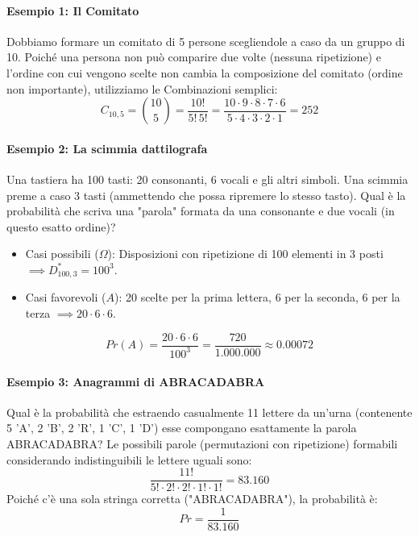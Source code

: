 \documentclass[12pt, a4paper]{article}
\begin{document}
\paragraph{Esempio 1: Il Comitato}
Dobbiamo formare un comitato di 5 persone scegliendole a caso da un gruppo di 10.
Poiché una persona non può comparire due volte (nessuna ripetizione) e l'ordine con cui vengono scelte non cambia la composizione del comitato (ordine non importante), utilizziamo le Combinazioni semplici:
$$ C_{10,5} = \binom{10}{5} = \frac{10!}{5! \, 5!} = \frac{10 \cdot 9 \cdot 8 \cdot 7 \cdot 6}{5 \cdot 4 \cdot 3 \cdot 2 \cdot 1} = 252 $$

\paragraph{Esempio 2: La scimmia dattilografa}
Una tastiera ha 100 tasti: 20 consonanti, 6 vocali e gli altri simboli. Una scimmia preme a caso 3 tasti (ammettendo che possa ripremere lo stesso tasto). Qual è la probabilità che scriva una "parola" formata da una consonante e due vocali (in questo esatto ordine)?
\begin{itemize}
    \item Casi possibili ($\Omega$): Disposizioni con ripetizione di 100 elementi in 3 posti $\implies D_{100,3}^* = 100^3$.
    \item Casi favorevoli ($A$): 20 scelte per la prima lettera, 6 per la seconda, 6 per la terza $\implies 20 \cdot 6 \cdot 6$.
\end{itemize}
$$ Pr(A) = \frac{20 \cdot 6 \cdot 6}{100^3} = \frac{720}{1.000.000} \approx 0.00072 $$

\paragraph{Esempio 3: Anagrammi di ABRACADABRA}
Qual è la probabilità che estraendo casualmente 11 lettere da un'urna (contenente 5 'A', 2 'B', 2 'R', 1 'C', 1 'D') esse compongano esattamente la parola ABRACADABRA?
Le possibili parole (permutazioni con ripetizione) formabili considerando indistinguibili le lettere uguali sono:
$$ \frac{11!}{5! \cdot 2! \cdot 2! \cdot 1! \cdot 1!} = 83.160 $$
Poiché c'è una sola stringa corretta ("ABRACADABRA"), la probabilità è:
$$ Pr = \frac{1}{83.160} $$
\end{document}
